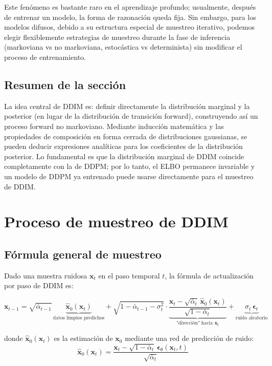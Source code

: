 \documentclass[a4paper]{article}
\begin{document}
Este fenómeno es bastante raro en el aprendizaje profundo; usualmente, después de entrenar un modelo, la forma de razonación queda fija. Sin embargo, para los modelos difusos, debido a su estructura especial de muestreo iterativo, podemos elegir flexiblemente estrategias de muestreo durante la fase de inferencia (markoviana vs no markoviana, estocástica vs determinista) sin modificar el proceso de entrenamiento.

\subsection{Resumen de la sección}

La idea central de DDIM es: definir directamente la distribución marginal y la posterior (en lugar de la distribución de transición forward), construyendo así un proceso forward no markoviano. Mediante inducción matemática y las propiedades de composición en forma cerrada de distribuciones gaussianas, se pueden deducir expresiones analíticas para los coeficientes de la distribución posterior. Lo fundamental es que la distribución marginal de DDIM coincide completamente con la de DDPM; por lo tanto, el ELBO permanece invariable y un modelo de DDPM ya entrenado puede usarse directamente para el muestreo de DDIM.
\section{Proceso de muestreo de DDIM}

\subsection{Fórmula general de muestreo}

Dado una muestra ruidosa $\mathbf{x}_t$ en el paso temporal $t$, la fórmula de actualización por paso de DDIM es:

$$
\mathbf{x}_{t-1} = \sqrt{\bar{\alpha}_{t-1}}\,\underbrace{\hat{\mathbf{x}}_0(\mathbf{x}_t)}_{\text{datos limpios predichos}} + \sqrt{1-\bar{\alpha}_{t-1}-\sigma_t^2}\cdot\underbrace{\frac{\mathbf{x}_t - \sqrt{\bar{\alpha}_t}\,\hat{\mathbf{x}}_0(\mathbf{x}_t)}{\sqrt{1-\bar{\alpha}_t}}}_{\text{"dirección" hacia } \mathbf{x}_t} + \underbrace{\sigma_t\,\boldsymbol{\epsilon}_t}_{\text{ruido aleatorio}}
$$

donde $\hat{\mathbf{x}}_0(\mathbf{x}_t)$ es la estimación de $\mathbf{x}_0$ mediante una red de predicción de ruido:
$$
\hat{\mathbf{x}}_0(\mathbf{x}_t) = \frac{\mathbf{x}_t - \sqrt{1-\bar{\alpha}_t}\,\boldsymbol{\epsilon}_\theta(\mathbf{x}_t, t)}{\sqrt{\bar{\alpha}_t}}
$$
\end{document}
